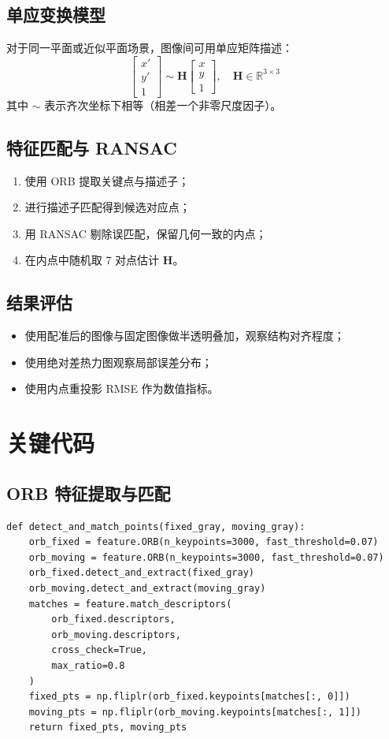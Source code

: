 \documentclass[UTF8,a4paper,12pt]{ctexart}
\begin{document}
\subsection{单应变换模型}
对于同一平面或近似平面场景，图像间可用单应矩阵描述：
\begin{equation}
\begin{bmatrix}
x'\\y'\\1
\end{bmatrix}
\sim
\mathbf{H}
\begin{bmatrix}
x\\y\\1
\end{bmatrix},
\quad
\mathbf{H}\in\mathbb{R}^{3\times3}
\end{equation}
其中 $\sim$ 表示齐次坐标下相等（相差一个非零尺度因子）。

\subsection{特征匹配与 RANSAC}
\begin{enumerate}
  \item 使用 ORB 提取关键点与描述子；
  \item 进行描述子匹配得到候选对应点；
  \item 用 RANSAC 剔除误匹配，保留几何一致的内点；
  \item 在内点中随机取 7 对点估计 $\mathbf{H}$。
\end{enumerate}

\subsection{结果评估}
\begin{itemize}
  \item 使用配准后的图像与固定图像做半透明叠加，观察结构对齐程度；
  \item 使用绝对差热力图观察局部误差分布；
  \item 使用内点重投影 RMSE 作为数值指标。
\end{itemize}

\section{关键代码}
\subsection{ORB 特征提取与匹配}
\begin{lstlisting}[style=py]
def detect_and_match_points(fixed_gray, moving_gray):
    orb_fixed = feature.ORB(n_keypoints=3000, fast_threshold=0.07)
    orb_moving = feature.ORB(n_keypoints=3000, fast_threshold=0.07)
    orb_fixed.detect_and_extract(fixed_gray)
    orb_moving.detect_and_extract(moving_gray)
    matches = feature.match_descriptors(
        orb_fixed.descriptors,
        orb_moving.descriptors,
        cross_check=True,
        max_ratio=0.8
    )
    fixed_pts = np.fliplr(orb_fixed.keypoints[matches[:, 0]])
    moving_pts = np.fliplr(orb_moving.keypoints[matches[:, 1]])
    return fixed_pts, moving_pts
\end{lstlisting}
\end{document}
